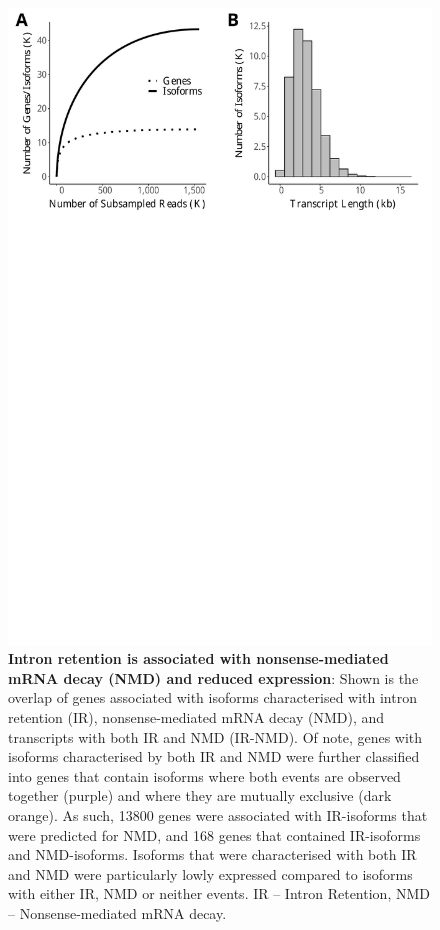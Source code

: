 \begin{figure}[htp]
	\begin{center}
		\includegraphics[page=6,trim={0 26cm 0 0},clip,scale = 0.55]{Figures/IsoSeqWholeTranscriptome.pdf}
	\end{center}
	\captionsetup{width=0.95\textwidth}
	\caption[Association of intron retention and NMD in Whole Transcriptome Iso-Seq]%
	{\textbf{Intron retention is associated with nonsense-mediated mRNA decay (NMD) and reduced expression}: Shown is the overlap of genes associated with isoforms characterised with intron retention (IR), nonsense-mediated mRNA decay (NMD), and transcripts with both IR and NMD (IR-NMD). Of note, genes with isoforms characterised by both IR and NMD were further classified into genes that contain isoforms where both events are observed together (purple) and where they are mutually exclusive (dark orange). As such, 13800 genes were associated with IR-isoforms that were predicted for NMD, and 168 genes that contained IR-isoforms and NMD-isoforms. Isoforms that were characterised with both IR and NMD were particularly lowly expressed compared to isoforms with either IR, NMD or neither events. IR – Intron Retention, NMD – Nonsense-mediated mRNA decay.}
	\label{fig:isoseq_whole_IRNMD}
\end{figure}


